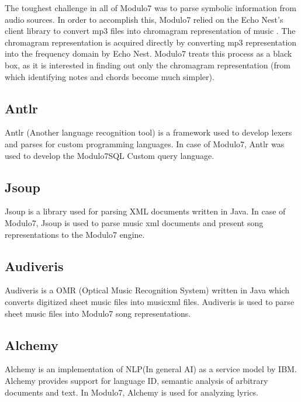 \noindent The toughest challenge in all of Modulo7 was to parse symbolic information from audio sources. In order to accomplish this, Modulo7 relied on the Echo Nest's client library to convert mp3 files into chromagram representation of music \cite{chromagramtutorial}. The chromagram representation is acquired directly by converting mp3 representation into the frequency domain by Echo Nest. Modulo7 treats this process as a black box, as it is interested in finding out only the chromagram representation (from which identifying notes and chords become much simpler). 

\subsection{Antlr}

\noindent Antlr (Another language recognition tool) is a framework used to develop lexers and parses for custom programming languages. In case of Modulo7, Antlr was used to develop the Modulo7SQL Custom query language.

\subsection{Jsoup}

\noindent Jsoup is a library used for parsing XML documents written in Java. In case of Modulo7, Jsoup is used to parse music xml documents and present song representations to the Modulo7 engine. 

\subsection{Audiveris}

\noindent Audiveris is a OMR (Optical Music Recognition System) written in Java which converts digitized sheet music files into musicxml files. Audiveris is used to parse sheet music files into Modulo7 song representations.

\subsection{Alchemy} \label{Alchemy}

\noindent Alchemy is an implementation of NLP(In general AI) as a service model by IBM. Alchemy provides support for language ID, semantic analysis of arbitrary documents and text. In Modulo7, Alchemy is used for analyzing lyrics.  


